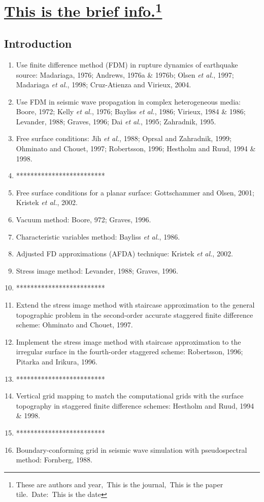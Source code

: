 \documentclass{article}
\newcommand{\Ppath}{/home/tche/Learning/Learning/Paper/}
\newcommand{\prf}{This is relative path from \Papth to the paper file}
\newcommand{\pmk}{This is the brief info.}
\newcommand{\pti}{This is the paper tile}
\newcommand{\pay}{These are authors and year}
\newcommand{\pjo}{This is the journal}
\newcommand{\pda}{This is the date}
\newcommand{\refp}[1]{\href{run:\Ppath\prf}{#1}}
\newcommand{\pinfo}{\refp{\pmk}\footnote{\pay,~\pjo,~\pti.~Date:~\pda}}
\newcommand{\sline}{*************************}
\newcommand{\etal}{\textit{et al.}}
\begin{document}
\section{\pinfo}
\subsection{Introduction}
\begin{enumerate}[\hspace{10mm}*]
  \item Use finite difference method (FDM) in rupture dynamics of earthquake source: Madariaga, 1976; Andrews, 1976a \& 1976b; Olsen \etal, 1997; Madariaga \etal, 1998; Cruz-Atienza and Virieux, 2004.
  \item Use FDM in seismic wave propagation in complex heterogeneous media: Boore, 1972; Kelly \etal, 1976; Bayliss \etal, 1986; Virieux, 1984 \& 1986; Levander, 1988; Graves, 1996; Dai \etal, 1995; Zahradnik, 1995.
  \item Free surface conditions: Jih \etal, 1988; Oprsal and Zahradnik, 1999; Ohminato and Chouet, 1997; Robertsson, 1996; Hestholm and Ruud, 1994 \& 1998.
  \item \sline
  \item Free surface conditions for a planar surface: Gottschammer and Olsen, 2001; Kristek \etal, 2002.
  \item Vacuum method: Boore, 972; Graves, 1996.
  \item Characteristic variables method: Bayliss \etal, 1986.
  \item Adjusted FD approximations (AFDA) technique: Kristek \etal, 2002.
  \item Stress image method: Levander, 1988; Graves, 1996.
  \item \sline
  \item Extend the stress image method with staircase approximation to the general topographic problem in the second-order accurate staggered finite difference scheme: Ohminato and Chouet, 1997.
  \item Implement the stress image method with staircase approximation to the irregular surface in the fourth-order staggered scheme: Robertsson, 1996; Pitarka and Irikura, 1996.
  \item \sline
  \item Vertical grid mapping to match the computational grids with the surface topography in staggered finite difference schemes: Hestholm and Ruud, 1994 \& 1998.
  \item \sline
  \item Boundary-conforming grid in seismic wave simulation with pseudospectral method: Fornberg, 1988.

\end{enumerate}
\end{document}
